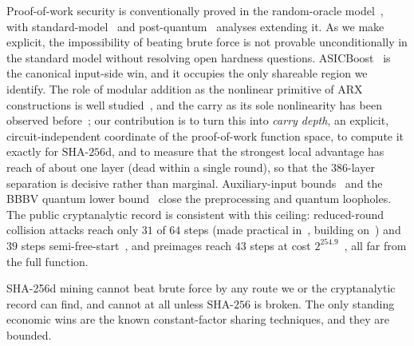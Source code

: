 \documentclass[11pt]{article}
\theoremstyle{remark}
\newcommand{\SHA}{\mathrm{SHA\text{-}256}}
\newcommand{\SHAd}{\mathrm{SHA\text{-}256d}}
\begin{document}
Proof-of-work security is conventionally proved in the random-oracle
model~\cite{backbone}, with standard-model~\cite{gkp} and
post-quantum~\cite{pqbackbone,hybrid} analyses extending it. As we make
explicit, the impossibility of beating brute force is not provable
unconditionally in the standard model without resolving open hardness
questions. ASICBoost~\cite{asicboost} is the canonical input-side win,
and it occupies the only shareable region we identify. The role of
modular addition as the nonlinear primitive of ARX constructions is well
studied~\cite{arx,sfunction}, and the carry as its sole nonlinearity has
been observed before~\cite{fieldjones}; our contribution is to turn this
into \emph{carry depth}, an explicit, circuit-independent coordinate of
the proof-of-work function space, to compute it exactly for $\SHAd$, and
to measure that the strongest local advantage has reach of about one
layer (dead within a single round), so
that the $386$-layer separation is decisive rather than marginal.
Auxiliary-input bounds~\cite{cdgs,cdg,unruh,dgk} and the BBBV quantum
lower bound~\cite{bbbv} close the preprocessing and quantum loopholes. The
public cryptanalytic record is consistent with this ceiling: reduced-round
collision attacks reach only $31$ of $64$ steps (made practical
in~\cite{lll24}, building on~\cite{mendel13}) and $39$ steps
semi-free-start~\cite{lll24}, and preimages reach $43$ steps at cost
$2^{254.9}$~\cite{aoki09}, all far from the full function.

SHA-256d mining cannot beat brute force by any route we or the
cryptanalytic record can find, and cannot at all unless $\SHA$ is broken.
The only standing economic wins are the known constant-factor sharing
techniques, and they are bounded.
\end{document}
